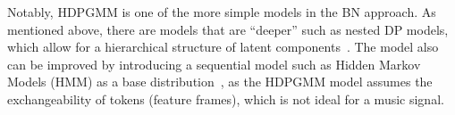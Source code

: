 \documentclass{article}
\begin{document}
Notably, HDPGMM is one of the more simple models in the BN approach. As mentioned above, there are models that are ``deeper'' such as nested DP models, which allow for a hierarchical structure of latent components~\cite{DBLP:journals/pami/PaisleyWBJ15}. The model also can be improved by introducing a sequential model such as Hidden Markov Models (HMM) as a base distribution~\cite{DBLP:conf/icassp/QiPC07}, as the HDPGMM model assumes the exchangeability of tokens (feature frames), which is not ideal for a music signal.


\end{document}
